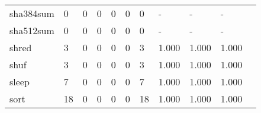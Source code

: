 \begin{longtable}{lp{1.2cm}p{1.2cm}p{1.2cm}p{1.2cm}p{1.2cm}p{1.2cm}p{1.2cm}p{1.2cm}p{1.2cm}p{1.2cm}}
sha384sum &                                     0 &                                                  0 &                                                  0 &                                                  0 &                                                  0 &                                                  0 &                                                  - &                                                  - &                                                  - \\
sha512sum &                                     0 &                                                  0 &                                                  0 &                                                  0 &                                                  0 &                                                  0 &                                                  - &                                                  - &                                                  - \\
shred     &                                     3 &                                                  0 &                                                  0 &                                                  0 &                                                  0 &                                                  3 &                                              1.000 &                                              1.000 &                                              1.000 \\
shuf      &                                     3 &                                                  0 &                                                  0 &                                                  0 &                                                  0 &                                                  3 &                                              1.000 &                                              1.000 &                                              1.000 \\
sleep     &                                     7 &                                                  0 &                                                  0 &                                                  0 &                                                  0 &                                                  7 &                                              1.000 &                                              1.000 &                                              1.000 \\
sort      &                                    18 &                                                  0 &                                                  0 &                                                  0 &                                                  0 &                                                 18 &                                              1.000 &                                              1.000 &                                              1.000 \\

\end{longtable}
